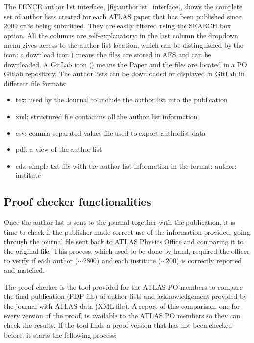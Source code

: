 The FENCE author list interface, \cref{fig:authorlist_interface}, shows the complete set of author lists created for each ATLAS paper that has been published since 2009 or is being submitted.
They are easily filtered using the SEARCH box option.
All the columns are self-explanatory; in the last column the dropdown menu gives access to the author list location, which can be distinguished by the icon:
a download icon {\faDownload}) means the files are stored in AFS and can be downloaded.
A GitLab icon (\faGitlab) means the Paper and the files are located in a PO Gitlab repository. The author lists can be downloaded or displayed in GitLab in different file formats:
\begin{itemize}
\item tex: used by the Journal to include the author list into the publication
\item xml: structured file containins all the author list information
\item csv: comma separated values file used to export authorlist data 
\item pdf: a view of the author list 
\item cds: simple txt file with the author list information in the format: author: institute
\end{itemize}

\subsection{Proof checker functionalities}
\label{sec:Proof_checker_functionalities}


Once the author list is sent to the journal together with the publication, it is time to check if the publisher made correct use of the information provided, going through the journal  file sent back to ATLAS Physics Office and comparing it to the original  file.
This process, which used to be done by hand, required the officer to verify if each author ($\sim$2800) and each institute ($\sim$200) is correctly reported and matched.

The proof checker is the tool provided for the ATLAS PO members to compare the final publication (PDF file) of author lists and acknowledgement provided by the journal with ATLAS data (XML file). A report of this comparison, one for every version of the proof, is available to the ATLAS PO members so they can check the results.
If the tool finds a proof version that has not been checked before, it starts the following process:

